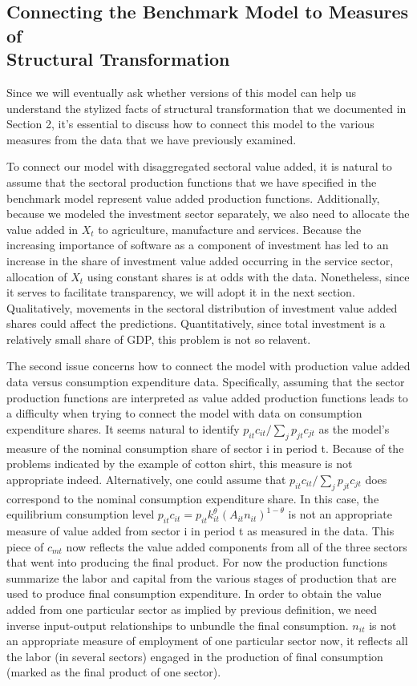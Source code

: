 \documentclass{article}
\begin{document}
    \subsection{Connecting the Benchmark Model to Measures of\\ Structural Transformation}
    Since we will eventually ask whether versions of this model can help us understand the stylized facts of structural transformation that we documented in Section 2, it's essential to discuss how to connect this model to the various measures from the data that we have previously examined.

    To connect our model with disaggregated sectoral value added, it is natural to assume that the sectoral production functions that we have specified in the benchmark model represent value added production functions. Additionally, because we modeled the investment sector separately, we also need to allocate the value added in $X_t$ to agriculture, manufacture and services. Because the increasing importance of software as a component of investment has led to an increase in the share of investment value added occurring in the service sector, allocation of $X_t$ using constant shares is at odds with the data. Nonetheless, since it serves to facilitate transparency, we will adopt it in the next section. Qualitatively, movements in the sectoral distribution of investment value added shares could affect the predictions. Quantitatively, since total investment is a relatively small share of GDP, this problem is not so relavent.

    The second issue concerns how to connect the model with production value added data versus consumption expenditure data. Specifically, assuming that the sector production functions are interpreted as value added production functions leads to a difficulty when trying to connect the model with data on consumption expenditure shares. It seems natural to identify $p_{it}c_{it}/\sum_j p_{jt}c_{jt}$ as the model’s measure of the nominal consumption share of sector i in period t. Because of the problems indicated by the example of cotton shirt, this measure is not appropriate indeed. Alternatively, one could assume that $p_{it}c_{it}/\sum_j p_{jt}c_{jt}$ does correspond to the nominal consumption expenditure share. In this case, the equilibrium consumption level $p_{it}c_{it}=p_{it}k_{it}^\theta (A_{it}n_{it})^{1-\theta}$ is not an appropriate measure of value added from sector i in period t as measured in the data. This piece of $c_{mt}$ now reflects the value added components from all of the three sectors that went into producing the final product. For now the production functions summarize the labor and capital from the various stages of production that are used to produce final consumption expenditure. In order to obtain the value added from one particular sector as implied by previous definition, we need inverse input-output relationships to unbundle the final consumption. $n_{it}$ is not an appropriate measure of employment of one particular sector now, it reflects all the labor (in several sectors) engaged in the production of final consumption (marked as the final product of one sector).
\end{document}
